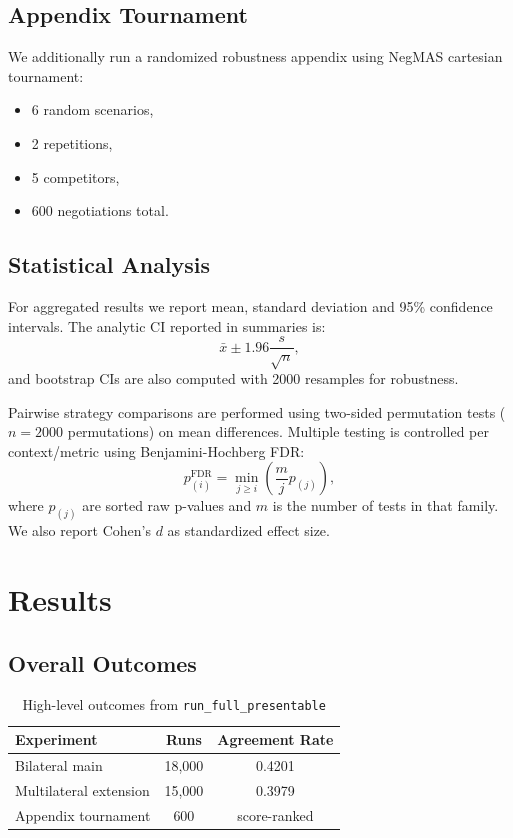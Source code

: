 \documentclass[11pt]{article}
\begin{document}
\subsection{Appendix Tournament}
We additionally run a randomized robustness appendix using NegMAS cartesian tournament:
\begin{itemize}[leftmargin=1.5em]
    \item 6 random scenarios,
    \item 2 repetitions,
    \item 5 competitors,
    \item 600 negotiations total.
\end{itemize}

\subsection{Statistical Analysis}
For aggregated results we report mean, standard deviation and 95\% confidence intervals. The analytic CI reported in summaries is:
\[
\bar{x} \pm 1.96\frac{s}{\sqrt{n}},
\]
and bootstrap CIs are also computed with 2000 resamples for robustness.

Pairwise strategy comparisons are performed using two-sided permutation tests (\(n=2000\) permutations) on mean differences. Multiple testing is controlled per context/metric using Benjamini-Hochberg FDR:
\[
p^{\text{FDR}}_{(i)} = \min_{j \ge i}\left(\frac{m}{j}p_{(j)}\right),
\]
where \(p_{(j)}\) are sorted raw p-values and \(m\) is the number of tests in that family. We also report Cohen's \(d\) as standardized effect size.

\section{Results}
\subsection{Overall Outcomes}
\begin{table}[H]
\centering
\caption{High-level outcomes from \texttt{run\_full\_presentable}}
\begin{tabular}{lcc}
\toprule
\textbf{Experiment} & \textbf{Runs} & \textbf{Agreement Rate} \\
\midrule
Bilateral main & 18,000 & 0.4201 \\
Multilateral extension & 15,000 & 0.3979 \\
Appendix tournament & 600 & score-ranked \\
\bottomrule
\end{tabular}
\end{table}
\end{document}
